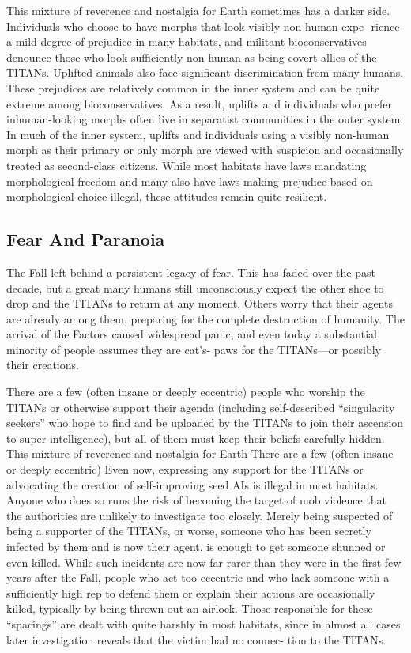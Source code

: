 This mixture of reverence and nostalgia for Earth 
sometimes has a darker side. Individuals who choose 
to have morphs that look visibly non-human expe-
rience a mild degree of prejudice in many habitats, 
and militant bioconservatives denounce those who 
look sufficiently non-human as being covert allies 
of the TITANs. Uplifted animals also face significant 
discrimination from many humans. These prejudices 
are relatively common in the inner system and can 
be quite extreme among bioconservatives. As a result, 
uplifts and individuals who prefer inhuman-looking 
morphs often live in separatist communities in the 
outer system. In much of the inner system, uplifts and 
individuals using a visibly non-human morph as their 
primary or only morph are viewed with suspicion and 
occasionally treated as second-class citizens. While 
most habitats have laws mandating morphological 
freedom and many also have laws making prejudice 
based on morphological choice illegal, these attitudes 
remain quite resilient.

\subsection{Fear And Paranoia}

The Fall left behind a persistent legacy of fear. This has 
faded over the past decade, but a great many humans 
still unconsciously expect the other shoe to drop and 
the TITANs to return at any moment. Others worry 
that their agents are already among them, preparing for 
the complete destruction of humanity. The arrival of 
the Factors caused widespread panic, and even today a 
substantial minority of people assumes they are cat's-
paws for the TITANs—or possibly their creations.

There are a few (often insane or deeply eccentric) 
people who worship the TITANs or otherwise support 
their agenda (including self-described ``singularity 
seekers'' who hope to find and be uploaded by the 
TITANs to join their ascension to super-intelligence), 
but all of them must keep their beliefs carefully hidden. 
This mixture of reverence and nostalgia for Earth 
There are a few (often insane or deeply eccentric) 
Even now, expressing any support for the TITANs or 
advocating the creation of self-improving seed AIs 
is illegal in most habitats. Anyone who does so runs 
the risk of becoming the target of mob violence that 
the authorities are unlikely to investigate too closely. 
Merely being suspected of being a supporter of the 
TITANs, or worse, someone who has been secretly 
infected by them and is now their agent, is enough 
to get someone shunned or even killed. While such 
incidents are now far rarer than they were in the first 
few years after the Fall, people who act too eccentric 
and who lack someone with a sufficiently high rep to 
defend them or explain their actions are occasionally 
killed, typically by being thrown out an airlock. Those 
responsible for these ``spacings'' are dealt with quite 
harshly in most habitats, since in almost all cases later 
investigation reveals that the victim had no connec-
tion to the TITANs.

